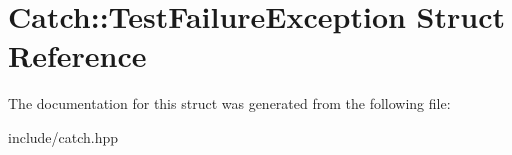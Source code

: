 \hypertarget{structCatch_1_1TestFailureException}{}\section{Catch\+:\+:Test\+Failure\+Exception Struct Reference}
\label{structCatch_1_1TestFailureException}


The documentation for this struct was generated from the following file\+:\begin{DoxyCompactItemize}
\item 
include/catch.\+hpp\end{DoxyCompactItemize}
